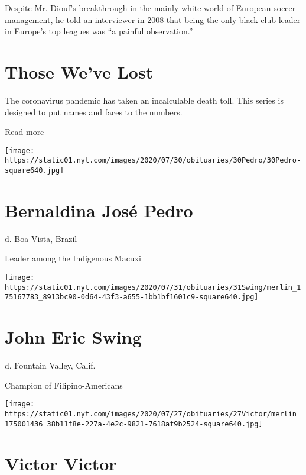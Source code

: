 Despite Mr. Diouf's breakthrough in the mainly white world of European
soccer management, he told an interviewer in 2008 that being the only
black club leader in Europe's top leagues was ``a painful observation.''

\href{https://www.nytimes.com/interactive/2020/obituaries/people-died-coronavirus-obituaries.html?action=click\&pgtype=Article\&state=default\&region=BELOW_MAIN_CONTENT\&context=covid_obits_promo}{}

\hypertarget{those-weve-lost}{%
\section{Those We've Lost}\label{those-weve-lost}}

The coronavirus pandemic has taken an incalculable death toll. This
series is designed to put names and faces to the numbers.

Read more

\texttt{[image: https://static01.nyt.com/images/2020/07/30/obituaries/30Pedro/30Pedro-square640.jpg]}

\hypertarget{bernaldina-josuxe9-pedro}{%
\section{Bernaldina José Pedro}\label{bernaldina-josuxe9-pedro}}

d. Boa Vista, Brazil

Leader among the Indigenous Macuxi

\texttt{[image: https://static01.nyt.com/images/2020/07/31/obituaries/31Swing/merlin\_175167783\_8913bc90-0d64-43f3-a655-1bb1bf1601c9-square640.jpg]}

\hypertarget{john-eric-swing}{%
\section{John Eric Swing}\label{john-eric-swing}}

d. Fountain Valley, Calif.

Champion of Filipino-Americans

\texttt{[image: https://static01.nyt.com/images/2020/07/27/obituaries/27Victor/merlin\_175001436\_38b11f8e-227a-4e2c-9821-7618af9b2524-square640.jpg]}

\hypertarget{victor-victor}{%
\section{Victor Victor}\label{victor-victor}}

